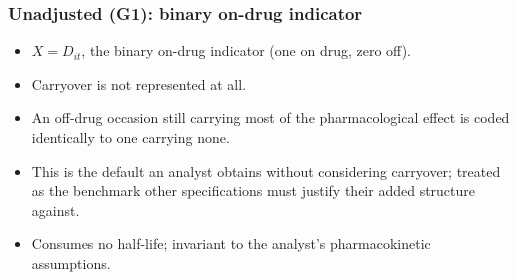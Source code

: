 \documentclass[
  11pt,
]{article}
\newcounter{none} %
\providecommand{\tightlist}{%
  \setlength{\itemsep}{0pt}\setlength{\parskip}{0pt}}
\begin{document}
\begin{table}
\centering
\caption{\label{tab:tab-spec-summary}All nine analysis specifications evaluated in this
    manuscript. G1-G3 are the Tier 1 headline three (Section 2.4);
    G4-G5 are Tier 2 additions replacing the retired E4/E5/E6
    (Blocks S7-S9, Section 3.7); G6-G9 are CR2 cluster-robust
    variants of G1, G2, G4, and G3 respectively (Block S10). G10
    (G5+CR2) does not apply and is omitted: G5 collapses to one row
    per patient before fitting, leaving no repeated-measures cluster
    structure for CR2 to correct.}
\centering
{}
\end{table}

\subsubsection{Unadjusted (G1): binary on-drug indicator}\label{unadjusted-g1-binary-on-drug-indicator}

\begin{itemize}
\tightlist
\item
  \(X = D_{it}\), the binary on-drug indicator (one on drug, zero off).
\item
  Carryover is not represented at all.
\item
  An off-drug occasion still carrying most of the pharmacological
  effect is coded identically to one carrying none.
\item
  This is the default an analyst obtains without considering
  carryover; treated as the benchmark other specifications must
  justify their added structure against.
\item
  Consumes no half-life; invariant to the analyst's pharmacokinetic
  assumptions.
\end{itemize}
\end{document}
